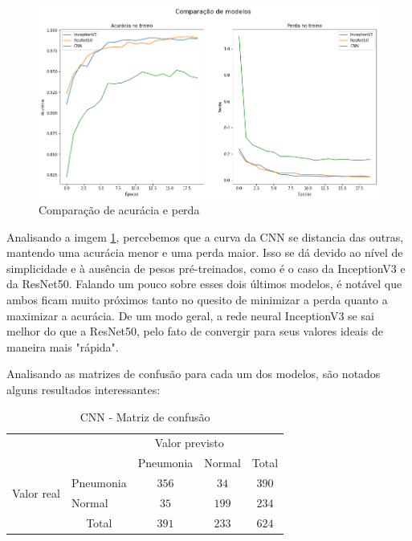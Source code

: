 \begin{figure}[!ht]
    \begin{center}
    \includegraphics[width=400pt]{pictures/comparação entre modelos.png}
    \caption{Comparação de acurácia e perda}
    \label{pic:grafico_comparativo}
    \end{center}
\end{figure}

\newpage 

Analisando a imgem \ref{pic:grafico_comparativo}, percebemos que a curva da CNN se distancia das outras, mantendo uma acurácia menor e uma perda maior. Isso se dá devido ao nível de simplicidade e à ausência de pesos pré-treinados, como é o caso da InceptionV3 e da ResNet50. Falando um pouco sobre esses dois últimos modelos, é notável que ambos ficam muito próximos tanto no quesito de minimizar a perda quanto a maximizar a acurácia. De um modo geral, a rede neural InceptionV3 se sai melhor do que a ResNet50, pelo fato de convergir para seus valores ideais de maneira mais "rápida".

Analisando as matrizes de confusão para cada um dos modelos, são notados alguns resultados interessantes:

\begin{table}[!ht]
    \centering
    \begin{tabular}{l|l|c|c|c}
        \multicolumn{2}{c}{}&\multicolumn{2}{c}{Valor previsto}&\\
        \cline{3-4}
        \multicolumn{2}{c|}{}&Pneumonia&Normal&\multicolumn{1}{c}{Total}\\
        \cline{2-4}
        \multirow{2}{*}{Valor real}& Pneumonia & $356$ & $34$ & $390$\\
        \cline{2-4}
        & Normal & $35$ & $199$ & $234$\\
        \cline{2-4}
        \multicolumn{1}{c}{} & \multicolumn{1}{c}{Total} & \multicolumn{1}{c}{$391$} & \multicolumn{    1}{c}{$233$} & \multicolumn{1}{c}{$624$}\\
    \end{tabular}
    \caption{CNN - Matriz de confusão}
    \label{tab:cm_cnn}
\end{table}


